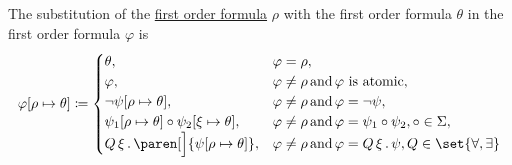 \begin{definition}
\begin{defenum}
    The substitution of the \hyperref[def:first_order_syntax/formula]{first order formula} \( \rho \) with the first order formula \( \theta \) in the first order formula \( \varphi \) is
    \begin{equation}\label{eq:def:first_order_substitution/formula_in_formula}
      \varphi[\rho \mapsto \theta] \coloneqq \begin{cases}
        \theta,                                                       &\varphi = \rho, \\
        \varphi,                                                      &\varphi \neq \rho \T{and} \varphi \text{ is atomic}, \\
        \neg \psi[\rho \mapsto \theta],                               &\varphi \neq \rho \T{and} \varphi = \neg \psi, \\
        \psi_1[\rho \mapsto \theta] \circ \psi_2[\xi \mapsto \theta], &\varphi \neq \rho \T{and} \varphi = \psi_1 \circ \psi_2, \circ \in \Sigma, \\
        \quantifier{Q}{\xi} \paren[\Big]{\psi[\rho \mapsto \theta]},     &\varphi \neq \rho \T{and} \varphi = \quantifier{Q}{\xi} \psi, Q \in \set{ \forall, \exists }
      \end{cases}
    \end{equation}
  \end{defenum}
\end{definition}

